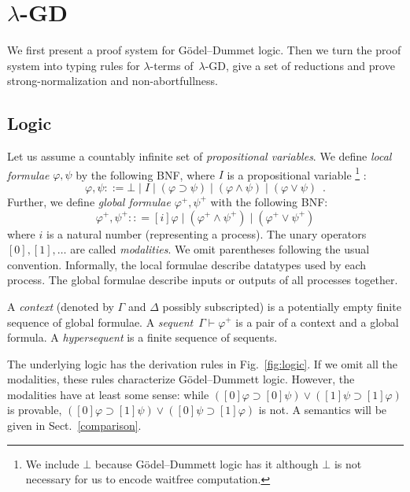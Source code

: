 \documentclass[doctor]{iscs-thesis}
\newcommand{\lgd}{$\lambda$-GD}
\begin{document}
\section{\lgd}
\label{lgd}

We first present a proof system for G\"odel--Dummet logic.
Then we turn the proof system into typing rules for $\lambda$-terms
of~\lgd, give a set of reductions and prove strong-normalization and
non-abortfullness.

\subsection{Logic}

\newcommand{\m}[1]{{#1}^+}

Let us assume a countably infinite set of \textit{propositional variables}.
We define \textit{local formulae} $\varphi, \psi$ by the following BNF,
where $I$ is a
propositional variable%
\footnote{We include $\bot$ because G\"odel--Dummett logic has it
although $\bot$ is not necessary for us to encode waitfree computation.}%
:
\[
 \varphi,\psi ::= \bot \mid I \mid (\varphi\supset\psi) \mid (\varphi\wedge\psi) \mid
 (\varphi\vee\psi)\enspace.
\]
Further, we define \textit{global formulae} $\m\varphi, \m\psi$ with the following
BNF:
\[
 \m\varphi,\m\psi :: = [i]\varphi \mid
 (\m\varphi\wedge\m\psi)\mid (\m\varphi\vee\m\psi)
\]
where $i$ is a natural number (representing a process).  The unary operators $[0],
[1],\ldots$ are called \textit{modalities}.
We omit parentheses following the usual convention.
Informally, the local formulae describe datatypes used by each process.
The global formulae describe inputs or outputs of all
processes together.

A \textit{context} (denoted by $\Gamma$ and $\Delta$ possibly
subscripted) is a potentially empty
finite sequence of global formulae.
A \textit{sequent}~$\Gamma\vdash\m\varphi$ is a pair of a context and a
global formula.
A \textit{hypersequent} is a finite sequence of sequents.

The underlying logic has the derivation rules in Fig.~\ref{fig:logic}.  If
we omit all the modalities, these rules characterize
G\"odel--Dummett logic.
However, the modalities have at least some sense: while
$([0]\varphi\supset[0]\psi)\vee([1]\psi\supset[1]\varphi)$ is provable,
$([0]\varphi\supset[1]\psi)\vee([0]\psi\supset[1]\varphi)$ is not.
A semantics will be given in Sect.~\ref{comparison}.
\end{document}

